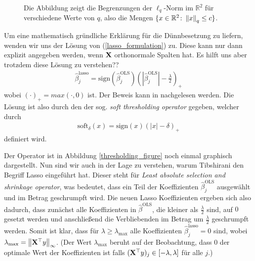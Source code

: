 \begin{figure}
\caption{Die Abbildung zeigt die Begrenzungen der $\ell_q$-Norm im $\mathbb{R}^2$ für verschiedene Werte von $q$, also die Mengen $\{x \in \mathbb{R}^2 \colon \left\lVert x \right\rVert_{q} \leq c \}$.}
\label{norm_figure}
\end{figure}

Um eine mathematisch gründliche Erklärung für die Dünnbesetzung zu liefern, wenden wir uns der Lösung von (\ref{lasso_formulation}) zu. Diese kann nur dann explizit angegeben werden, wenn $\mathbf{X}$ orthonormale Spalten hat. Es hilft uns aber trotzdem diese Lösung zu verstehen??
\begin{align}
\hat{\beta}_j^{\text{lasso}} = \text{sign}(\hat{\beta}_j^{\text{OLS}}) \left(\left|\hat{\beta}_j^{\text{OLS}}\right| - \frac{\lambda}{2}\right)_{+}
\end{align}
wobei $(\cdot)_+ = max(\cdot, 0)$ ist. Der Beweis kann in \cite{murphy} nachgelesen werden. Die Lösung ist also durch den der sog. \textit{soft thresholding operator} gegeben, welcher durch
\begin{align}
\text{soft}_{\delta}(x) = \text{sign}(x)(|x| - \delta)_+
\end{align}
definiert wird.

Der Operator ist in Abbildung \ref{thresholding_figure} noch einmal graphisch dargestellt. Nun sind wir auch in der Lage zu verstehen, warum Tibshirani \cite{tibshirani_lasso} den Begriff Lasso eingeführt hat. Dieser steht für \textit{Least absolute selection and shrinkage operator}, was bedeutet, dass ein Teil der Koeffizienten $\hat{\beta}_j^{\text{OLS}}$ ausgewählt und im Betrag geschrumpft wird. Die neuen Lasso Koeffizienten ergeben sich also dadurch, dass zunächst alle Koeffizienten in $\hat{\beta}^{\text{OLS}}$, die kleiner als $\frac{\lambda}{2}$ sind, auf $0$ gesetzt werden und anschließend die Verbliebenden im Betrag um $\frac{\lambda}{2}$ geschrumpft werden. Somit ist klar, dass für $\lambda \geq \lambda_{\text{max}}$ alle Koeffizienten $\hat{\beta}_j^{\text{lasso}} = 0$ sind, wobei $\lambda_{\text{max}} = \left\lVert \mathbf{X}^{\top}y \right\rVert_{\infty}$. (Der Wert $\lambda_{\text{max}}$ beruht auf der Beobachtung, dass $0$ der optimale Wert der Koeffizienten ist falls $(\mathbf{X}^{\top}y)_j \in [-\lambda, \lambda]$ für alle $j$.) 

